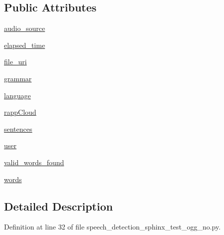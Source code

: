 \subsection*{Public Attributes}
\begin{DoxyCompactItemize}
\item 
\hyperlink{classspeech__detection__sphinx__test__ogg__no_1_1RappInterfaceTest_a4b73454aff2d2e089de6cee9243c52c4}{audio\-\_\-source}
\item 
\hyperlink{classspeech__detection__sphinx__test__ogg__no_1_1RappInterfaceTest_a68b5834fa013b79f8f446cf382bf41c8}{elapsed\-\_\-time}
\item 
\hyperlink{classspeech__detection__sphinx__test__ogg__no_1_1RappInterfaceTest_a544568b2ec4a84a830bf778e3b136dd2}{file\-\_\-uri}
\item 
\hyperlink{classspeech__detection__sphinx__test__ogg__no_1_1RappInterfaceTest_aebd085fa535e112cc182f2ab65c71f28}{grammar}
\item 
\hyperlink{classspeech__detection__sphinx__test__ogg__no_1_1RappInterfaceTest_a7ff58c8766d9369f28e90b4377598957}{language}
\item 
\hyperlink{classspeech__detection__sphinx__test__ogg__no_1_1RappInterfaceTest_aa4a8c723c6df488244094517a197daff}{rapp\-Cloud}
\item 
\hyperlink{classspeech__detection__sphinx__test__ogg__no_1_1RappInterfaceTest_a2b34be2155c7fbdfbc91ce1a74cb5df3}{sentences}
\item 
\hyperlink{classspeech__detection__sphinx__test__ogg__no_1_1RappInterfaceTest_a88c4edd12ea37ac7adca43291326237d}{user}
\item 
\hyperlink{classspeech__detection__sphinx__test__ogg__no_1_1RappInterfaceTest_ac8c8d989b251b8cca337ad01613352db}{valid\-\_\-words\-\_\-found}
\item 
\hyperlink{classspeech__detection__sphinx__test__ogg__no_1_1RappInterfaceTest_a83d7a4a30f76533c52d704470382c8cb}{words}
\end{DoxyCompactItemize}


\subsection{Detailed Description}


Definition at line 32 of file speech\-\_\-detection\-\_\-sphinx\-\_\-test\-\_\-ogg\-\_\-no.\-py.



